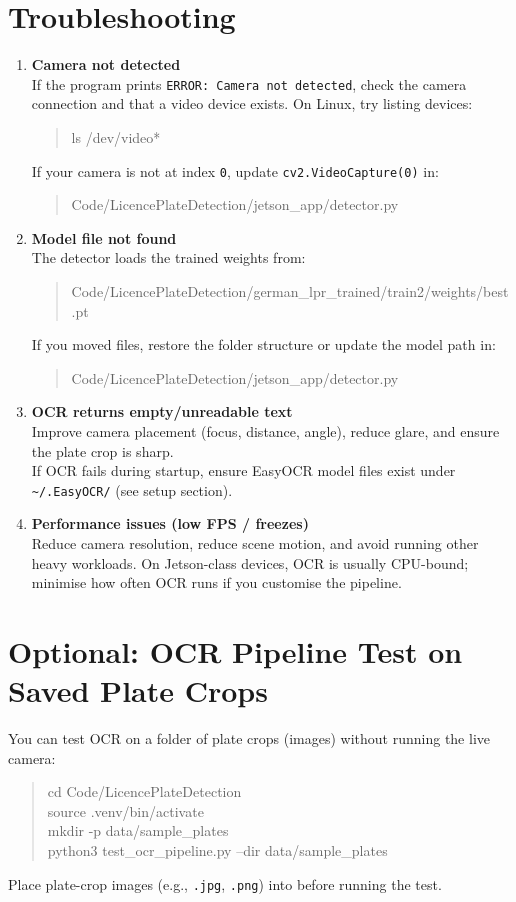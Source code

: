 \documentclass[11pt,a4paper]{article}
\begin{document}
\section{Troubleshooting}
\begin{enumerate}
    \item \textbf{Camera not detected}\\
    If the program prints \texttt{ERROR: Camera not detected}, check the camera connection and that a video device exists.
    On Linux, try listing devices:
    \begin{quote}\ttfamily
    ls /dev/video*
    \end{quote}
    If your camera is not at index \texttt{0}, update \texttt{cv2.VideoCapture(0)} in:
    \begin{quote}\ttfamily
    Code/LicencePlateDetection/jetson\_app/detector.py
    \end{quote}

    \item \textbf{Model file not found}\\
    The detector loads the trained weights from:
    \begin{quote}\ttfamily
    Code/LicencePlateDetection/german\_lpr\_trained/train2/weights/best.pt
    \end{quote}
    If you moved files, restore the folder structure or update the model path in:
    \begin{quote}\ttfamily
    Code/LicencePlateDetection/jetson\_app/detector.py
    \end{quote}

    \item \textbf{OCR returns empty/unreadable text}\\
    Improve camera placement (focus, distance, angle), reduce glare, and ensure the plate crop is sharp.\\
    If OCR fails during startup, ensure EasyOCR model files exist under \texttt{\textasciitilde/.EasyOCR/} (see setup section).

    \item \textbf{Performance issues (low FPS / freezes)}\\
    Reduce camera resolution, reduce scene motion, and avoid running other heavy workloads.
    On Jetson-class devices, OCR is usually CPU-bound; minimise how often OCR runs if you customise the pipeline.
\end{enumerate}

\section{Optional: OCR Pipeline Test on Saved Plate Crops}
You can test OCR on a folder of plate crops (images) without running the live camera:
\begin{quote}\ttfamily
cd Code/LicencePlateDetection\\
source .venv/bin/activate\\
mkdir -p data/sample\_plates\\
python3 test\_ocr\_pipeline.py --dir data/sample\_plates
\end{quote}
Place plate-crop images (e.g., \texttt{.jpg}, \texttt{.png}) into  before running the test.
\end{document}
